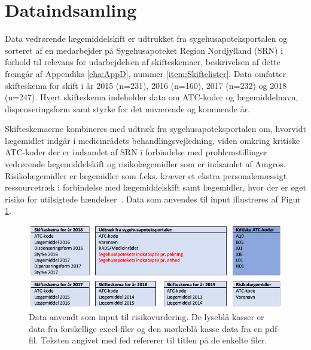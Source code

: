 
\section{Dataindsamling}
Data vedrørende lægemiddelskift er udtrukket fra sygehusapoteksportalen og sorteret af en medarbejder på Sygehusapoteket Region Nordjylland (SRN) i forhold til relevans for udarbejdelsen af skifteskemaer, beskrivelsen af dette fremgår af Appendiks \ref{cha:AppD}, nummer \ref{item:Skiftelister}. Data omfatter skifteskema for skift i år 2015 (n=231), 2016 (n=160), 2017 (n=232) og 2018 (n=247). Hvert skifteskema indeholder data om ATC-koder og lægemiddelnavn, dispenseringsform samt styrke for det nuværende og kommende år.

Skifteskemaerne kombineres med udtræk fra sygehusapoteksportalen om, hvorvidt lægemidlet indgår i medicinrådets behandlingsvejledning, viden omkring kritiske ATC-koder der er indsamlet af SRN i forbindelse med problemstillinger vedrørende lægemiddelskift og risikolægemidler som er indsamlet af Amgros. Risikolægemidler er lægemidler som f.eks. kræver et ekstra personalemæssigt ressourcetræk i forbindelse med lægemiddelskift samt lægemidler, hvor der er øget risiko for utilsigtede hændelser~\citep{Amgros}. Data som anvendes til input illustreres af Figur \ref{fig:Input}.

\begin{figure}[H]\centering
\includegraphics[width=1\textwidth]{billeder/Input.png} 
	\caption{Data anvendt som input til risikovurdering. De lyseblå kasser er data fra forskellige  excel-filer og den mørkeblå kasse data fra en pdf-fil. Teksten angivet med fed refererer til titlen på de enkelte filer.}
	\label{fig:Input}  
\end{figure}



